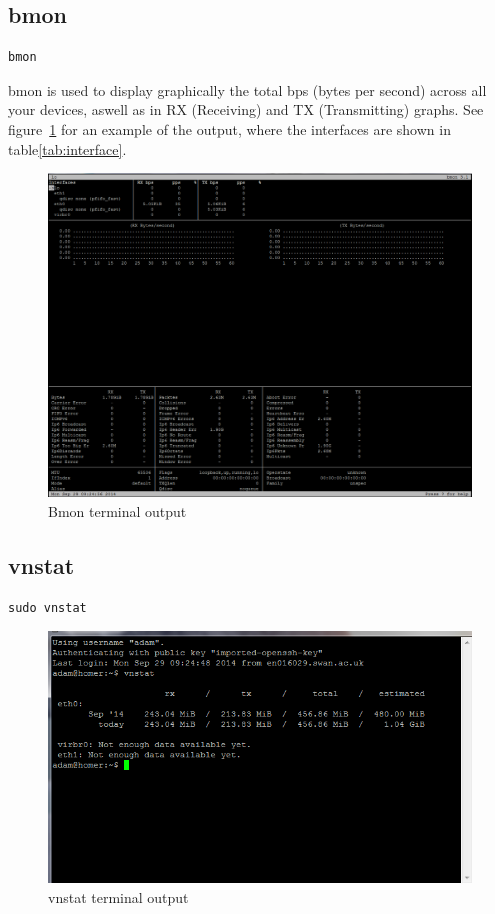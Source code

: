 \subsection{bmon}

\begin{lstlisting}
bmon
\end{lstlisting}

bmon is used to display graphically the total bps (bytes per second) across all your devices, aswell as in RX (Receiving) and TX (Transmitting) graphs.  See figure~\ref{fig:bmon} for an example of the output, where the interfaces are shown in table\ref{tab:interface}.

\begin{figure}[!th]
\centering
\includegraphics[scale=0.35]{./supportfiles/bmon.png}
\caption{Bmon terminal output}
\label{fig:bmon}
\end{figure}

\subsection{vnstat}

\begin{lstlisting}
sudo vnstat
\end{lstlisting}

\begin{figure}[!th]
\centering
\includegraphics[scale=0.75]{./supportfiles/vnstat.png}
\caption{vnstat terminal output}
\label{fig:vnstat}
\end{figure}


